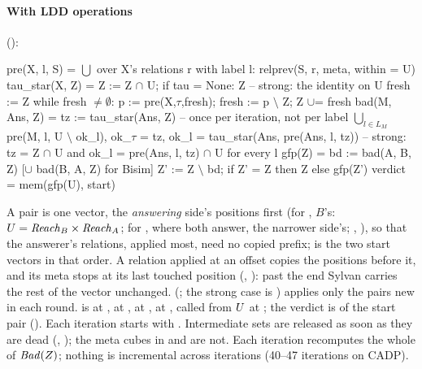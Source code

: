 \paragraph{With LDD operations} ():
\begin{shell}[mathescape=true]
pre(X, l, S)       = $\bigcup$ over X's relations r with label l: relprev(S, r, meta, within = U)
tau_star(X, Z)     = Z := Z $\cap$ U;  if tau = None: Z            -- strong: the identity on U
                     fresh := Z
                     while fresh $\ne\emptyset$: p := pre(X,$\tau$,fresh); fresh := p $\setminus$ Z; Z $\cup$= fresh
bad(M, Ans, Z)     = tz := tau_star(Ans, Z)                 -- once per iteration, not per label
                     $\bigcup_{l\in L_M}$ pre(M, l, U $\setminus$ ok_l),   ok_$\tau$ = tz,  ok_l = tau_star(Ans, pre(Ans, l, tz))
                     -- strong: tz = Z $\cap$ U and ok_l = pre(Ans, l, tz) $\cap$ U for every l
gfp(Z)             = bd := bad(A, B, Z) [$\cup$ bad(B, A, Z) for Bisim]
                     Z' := Z $\setminus$ bd;  if Z' = Z then Z else gfp(Z')
verdict            = mem(gfp(U), start)
\end{shell}
A pair is one vector, the \emph{answering} side's positions first (for
, $B$'s: $U = \mathit{Reach}_B \times \mathit{Reach}_A$; for ,
where both answer, the narrower side's; ,
), so that the answerer's relations, applied
most, need no copied prefix;  is the two start vectors in that
order. A relation applied at an offset copies the positions before it, and
its meta stops at its last touched position (,
): past the end Sylvan carries the rest of
the vector unchanged.
 (; the strong case is
) applies only the pairs new in each round.
 is at ,  at
,  at
,  at
, called from $U$ at
; the verdict is  of the start
pair (). Each iteration starts with
. Intermediate sets are released as soon as they are
dead (, ); the meta
cubes in  and  are not. Each iteration recomputes
the whole of $\mathit{Bad}(Z)$; nothing is incremental across iterations
(40--47 iterations on CADP).

